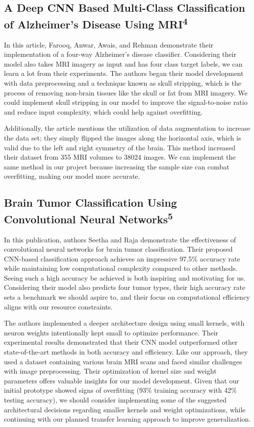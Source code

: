 \documentclass[conference]{IEEEtran}
\begin{document}
\subsection{\large A Deep CNN Based Multi-Class Classification of Alzheimer's Disease Using MRI\textsuperscript{4}}

In this article, Farooq, Anwar, Awais, and Rehman demonstrate their implementation of a four-way Alzheimer's disease classifier. Considering their model also takes MRI imagery as input and has four class target labels, we can learn a lot from their experiments. The authors began their model development with data preprocessing and a technique known as skull stripping, which is the process of removing non-brain tissues like the skull or fat from MRI imagery. We could implement skull stripping in our model to improve the signal-to-noise ratio and reduce input complexity, which could help against overfitting. 

Additionally, the article mentions the utilization of data augmentation to increase the data set; they simply flipped the images along the horizontal axis, which is valid due to the left and right symmetry of the brain. This method increased their dataset from 355 MRI volumes to 38024 images. We can implement the same method in our project because increasing the sample size can combat overfitting, making our model more accurate.

\subsection{\large Brain Tumor Classification Using Convolutional Neural Networks\textsuperscript{5}}

In this publication, authors Seetha and Raja demonstrate the effectiveness of convolutional neural networks for brain tumor classification. Their proposed CNN-based classification approach achieves an impressive 97.5\% accuracy rate while maintaining low computational complexity compared to other methods. Seeing such a high accuracy be achieved is both inspiring and motivating for us. Considering their model also predicts four tumor types, their high accuracy rate sets a benchmark we should aspire to, and their focus on computational efficiency aligns with our resource constraints. 

The authors implemented a deeper architecture design using small kernels, with neuron weights intentionally kept small to optimize performance. Their experimental results demonstrated that their CNN model outperformed other state-of-the-art methods in both accuracy and efficiency. Like our approach, they used a dataset containing various brain MRI scans and faced similar challenges with image preprocessing. Their optimization of kernel size and weight parameters offers valuable insights for our model development. Given that our initial prototype showed signs of overfitting (93\% training accuracy with 42\% testing accuracy), we should consider implementing some of the suggested architectural decisions regarding smaller kernels and weight optimizations, while continuing with our planned transfer learning approach to improve generalization.
\end{document}
